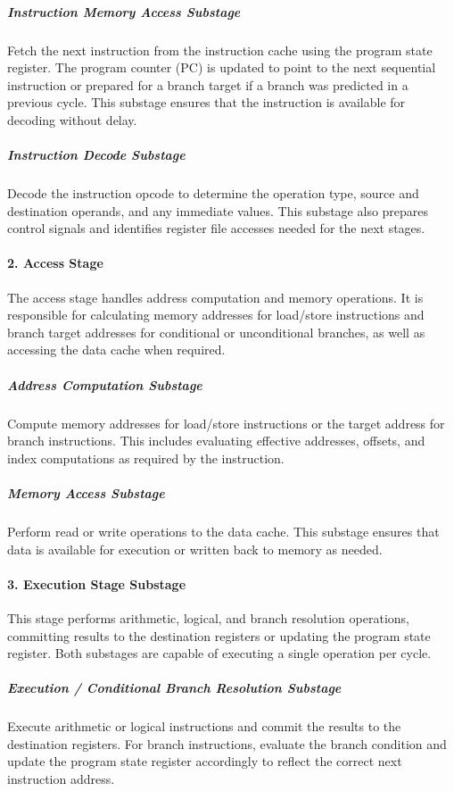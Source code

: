 \subparagraph{Instruction Memory Access Substage}
Fetch the next instruction from the instruction cache using the program state register. The program counter (PC) is updated to point to the next sequential instruction or prepared for a branch target if a branch was predicted in a previous cycle. This substage ensures that the instruction is available for decoding without delay.

\subparagraph{Instruction Decode Substage}
Decode the instruction opcode to determine the operation type, source and destination operands, and any immediate values. This substage also prepares control signals and identifies register file accesses needed for the next stages.

\paragraph{2. Access Stage}
The access stage handles address computation and memory operations. It is responsible for calculating memory addresses for load/store instructions and branch target addresses for conditional or unconditional branches, as well as accessing the data cache when required.

\subparagraph{Address Computation Substage}
Compute memory addresses for load/store instructions or the target address for branch instructions. This includes evaluating effective addresses, offsets, and index computations as required by the instruction.

\subparagraph{Memory Access Substage}
Perform read or write operations to the data cache. This substage ensures that data is available for execution or written back to memory as needed.

\paragraph{3. Execution Stage Substage}
This stage performs arithmetic, logical, and branch resolution operations, committing results to the destination registers or updating the program state register. Both substages are capable of executing a single operation per cycle.

\subparagraph{Execution / Conditional Branch Resolution Substage}
Execute arithmetic or logical instructions and commit the results to the destination registers. For branch instructions, evaluate the branch condition and update the program state register accordingly to reflect the correct next instruction address.



